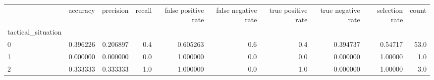 \begin{tabular}{lrrrrrrrrr}
\toprule
{} &  accuracy &  precision &  recall &  false positive rate &  false negative rate &  true positive rate &  true negative rate &  selection rate &  count \\
tactical\_situation &           &            &         &                      &                      &                     &                     &                 &        \\
\midrule
0                  &  0.396226 &   0.206897 &     0.4 &             0.605263 &                  0.6 &                 0.4 &            0.394737 &         0.54717 &   53.0 \\
1                  &  0.000000 &   0.000000 &     0.0 &             1.000000 &                  0.0 &                 0.0 &            0.000000 &         1.00000 &    1.0 \\
2                  &  0.333333 &   0.333333 &     1.0 &             1.000000 &                  0.0 &                 1.0 &            0.000000 &         1.00000 &    3.0 \\
\bottomrule
\end{tabular}
